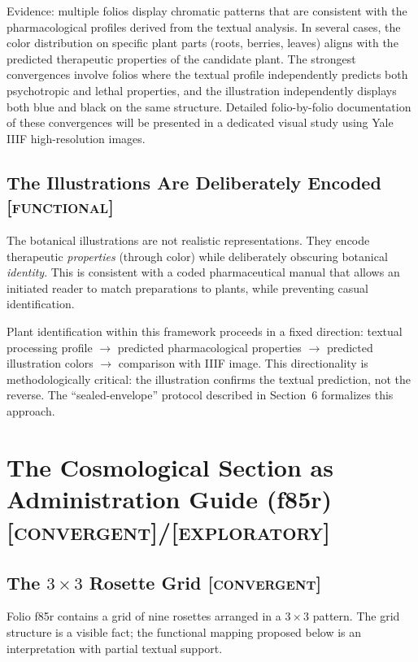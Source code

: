 \documentclass[11pt,a4paper]{article}
\newcommand{\functional}{\textsc{[functional]}}
\newcommand{\convergent}{\textsc{[convergent]}}
\newcommand{\exploratory}{\textsc{[exploratory]}}
\begin{document}
Evidence: multiple folios display chromatic patterns that are consistent with the pharmacological profiles derived from the textual analysis. In several cases, the color distribution on specific plant parts (roots, berries, leaves) aligns with the predicted therapeutic properties of the candidate plant. The strongest convergences involve folios where the textual profile independently predicts both psychotropic and lethal properties, and the illustration independently displays both blue and black on the same structure. Detailed folio-by-folio documentation of these convergences will be presented in a dedicated visual study using Yale IIIF high-resolution images.

\subsection{The Illustrations Are Deliberately Encoded \functional{}}

The botanical illustrations are not realistic representations. They encode therapeutic \textit{properties} (through color) while deliberately obscuring botanical \textit{identity}. This is consistent with a coded pharmaceutical manual that allows an initiated reader to match preparations to plants, while preventing casual identification.

Plant identification within this framework proceeds in a fixed direction: textual processing profile $\rightarrow$ predicted pharmacological properties $\rightarrow$ predicted illustration colors $\rightarrow$ comparison with IIIF image. This directionality is methodologically critical: the illustration confirms the textual prediction, not the reverse. The ``sealed-envelope'' protocol described in Section~6 formalizes this approach.

\section{The Cosmological Section as Administration Guide (f85r) \convergent{}/\exploratory{}}

\subsection{The $3 \times 3$ Rosette Grid \convergent{}}

Folio f85r contains a grid of nine rosettes arranged in a $3 \times 3$ pattern. The grid structure is a visible fact; the functional mapping proposed below is an interpretation with partial textual support.
\end{document}
